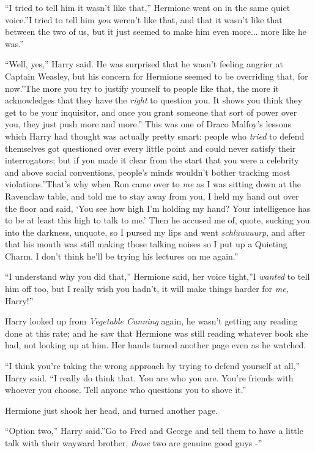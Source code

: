 ``I tried to tell him it wasn't like that,'' Hermione went on in the
same quiet voice.''I tried to tell him \emph{you} weren't like that, and
that it wasn't like that between the two of us, but it just seemed to
make him even more... more like he was.''

``Well, yes,'' Harry said. He was surprised that he wasn't feeling
angrier at Captain Weasley, but his concern for Hermione seemed to be
overriding that, for now.''The more you try to justify yourself to
people like that, the more it acknowledges that they have the
\emph{right} to question you. It shows you think they get to be your
inquisitor, and once you grant someone that sort of power over you, they
just push more and more.'' This was one of Draco Malfoy's lessons which
Harry had thought was actually pretty smart: people who \emph{tried} to
defend themselves got questioned over every little point and could never
satisfy their interrogators; but if you made it clear from the start
that you were a celebrity and above social conventions, people's minds
wouldn't bother tracking most violations.''That's why when Ron came over
to \emph{me} as I was sitting down at the Ravenclaw table, and told me
to stay away from you, I held my hand out over the floor and said, `You
see how high I'm holding my hand? Your intelligence has to be at least
this high to talk to me.' Then he accused me of, quote, sucking you into
the darkness, unquote, so I pursed my lips and went \emph{schluuuuurp},
and after that his mouth was still making those talking noises so I put
up a Quieting Charm. I don't think he'll be trying his lectures on me
again.''

``I understand why you did that,'' Hermione said, her voice tight,''I
\emph{wanted} to tell him off too, but I really wish you hadn't, it will
make things harder for \emph{me,} Harry!''

Harry looked up from \emph{Vegetable Cunning} again, he wasn't getting
any reading done at this rate; and he saw that Hermione was still
reading whatever book she had, not looking up at him. Her hands turned
another page even as he watched.

``I think you're taking the wrong approach by trying to defend yourself
at all,'' Harry said. ``I really do think that. You are who you are.
You're friends with whoever you choose. Tell anyone who questions you to
shove it.''

Hermione just shook her head, and turned another page.

``Option two,'' Harry said.''Go to Fred and George and tell them to have
a little talk with their wayward brother, \emph{those} two are genuine
good guys -''

